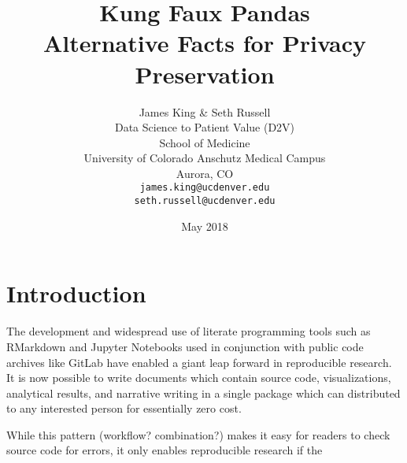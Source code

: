 \documentclass{article}
\title{%
  Kung Faux Pandas \\
  \large Alternative Facts for 
    Privacy Preservation}
\author{
  James King \& Seth Russell\\
  Data Science to Patient Value (D2V)\\
  School of Medicine \\
  University of Colorado Anschutz Medical Campus\\
  Aurora, CO\\
  \texttt{james.king@ucdenver.edu} \\ 
  \texttt{seth.russell@ucdenver.edu} \\
  }
\date{May 2018}
\begin{document}


\maketitle

\begin{abstract}

\end{abstract}

\section{Introduction}

The development and widespread use of literate programming tools such as RMarkdown and Jupyter Notebooks used in conjunction with public code archives like GitLab have enabled a giant leap forward in reproducible research.  It is now possible to write documents which contain source code, visualizations, analytical results, and narrative writing in a single package which can distributed to any interested person for essentially zero cost.

While this pattern (workflow? combination?) makes it easy for readers to check source code for errors, it only enables reproducible research if the 


\end{document}
